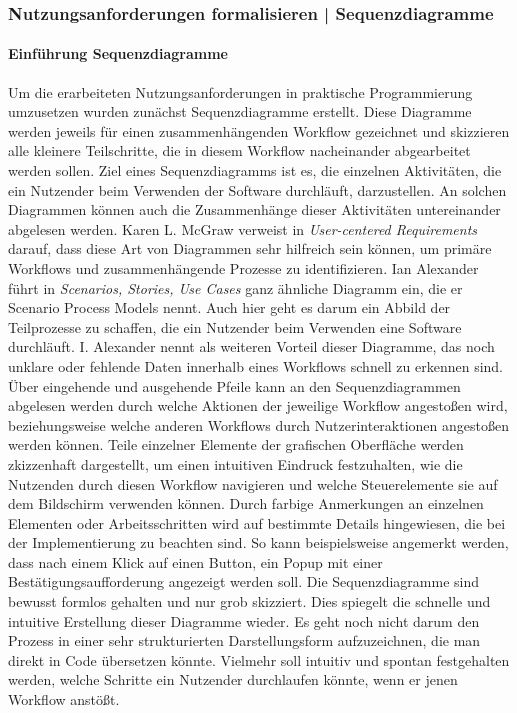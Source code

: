 \documentclass[12pt]{article}
\begin{document}
\subsubsection{Nutzungsanforderungen formalisieren | Sequenzdiagramme}

\paragraph{Einführung Sequenzdiagramme}
Um die erarbeiteten Nutzungsanforderungen in praktische Programmierung
umzusetzen wurden zunächst Sequenzdiagramme erstellt. Diese Diagramme werden
jeweils für einen zusammenhängenden Workflow gezeichnet und skizzieren alle
kleinere Teilschritte, die in diesem Workflow nacheinander abgearbeitet werden
sollen. Ziel eines Sequenzdiagramms ist es, die einzelnen Aktivitäten, die ein
Nutzender beim Verwenden der Software durchläuft,
darzustellen.\cite{holtzblattCDEvolved} An solchen Diagrammen können auch die
Zusammenhänge dieser Aktivitäten untereinander abgelesen werden. Karen L.
McGraw verweist in \textit{User-centered Requirements} darauf, dass diese Art
von Diagrammen sehr hilfreich sein können, um primäre Workflows und
zusammenhängende Prozesse zu identifizieren\cite{sequenceDiagrams}. Ian
Alexander führt in \textit{Scenarios, Stories, Use Cases} ganz ähnliche
Diagramm ein, die er Scenario Process Models nennt. Auch hier geht es darum ein
Abbild der Teilprozesse zu schaffen, die ein Nutzender beim Verwenden eine
Software durchläuft. I. Alexander nennt als weiteren Vorteil dieser Diagramme,
das noch unklare oder fehlende Daten innerhalb eines Workflows schnell zu
erkennen sind. Über eingehende und ausgehende Pfeile kann an den
Sequenzdiagrammen abgelesen werden durch welche Aktionen der jeweilige Workflow
angestoßen wird, beziehungsweise welche anderen Workflows durch
Nutzerinteraktionen angestoßen werden können. Teile einzelner Elemente der
grafischen Oberfläche werden zkizzenhaft dargestellt, um einen intuitiven
Eindruck festzuhalten, wie die Nutzenden durch diesen Workflow navigieren und
welche Steuerelemente sie auf dem Bildschirm verwenden können. Durch farbige
Anmerkungen an einzelnen Elementen oder Arbeitsschritten wird auf bestimmte
Details hingewiesen, die bei der Implementierung zu beachten sind. So kann
beispielsweise angemerkt werden, dass nach einem Klick auf einen Button, ein
Popup mit einer Bestätigungsaufforderung angezeigt werden soll. Die
Sequenzdiagramme sind bewusst formlos gehalten und nur grob skizziert. Dies
spiegelt die schnelle und intuitive Erstellung dieser Diagramme wieder. Es geht
noch nicht darum den Prozess in einer sehr strukturierten Darstellungsform
aufzuzeichnen, die man direkt in Code übersetzen könnte. Vielmehr soll intuitiv
und spontan festgehalten werden, welche Schritte ein Nutzender durchlaufen
könnte, wenn er jenen Workflow anstößt.
\end{document}

